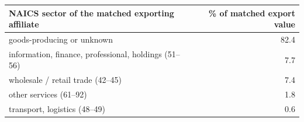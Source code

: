 \begin{tabular}{lr}
\toprule
NAICS sector of the matched exporting affiliate & \% of matched export value \\
\midrule
goods-producing or unknown & 82.4 \\
information, finance, professional, holdings (51--56) & 7.7 \\
wholesale / retail trade (42--45) & 7.4 \\
other services (61--92) & 1.8 \\
transport, logistics (48--49) & 0.6 \\
\bottomrule
\end{tabular}
